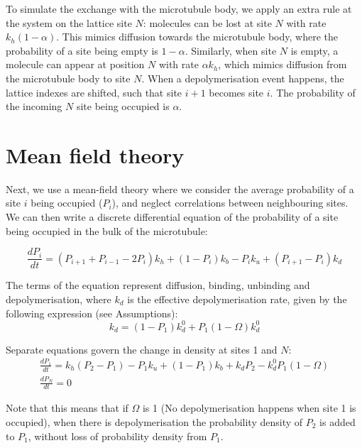 \documentclass{article}
\begin{document}
To simulate the exchange with the microtubule body, we apply an extra rule at the system on the lattice site $N$: molecules can be lost at site $N$ with rate $k_h(1-\alpha)$. This mimics diffusion towards the microtubule body, where the probability of a site being empty is $1-\alpha$. Similarly, when site $N$ is empty, a molecule can appear at position $N$ with rate $\alpha k_h$, which mimics diffusion from the microtubule body to site $N$.
When a depolymerisation event happens, the lattice indexes are shifted, such that site $i+1$ becomes site $i$. The probability of the incoming $N$ site being occupied is $\alpha$.

\section{Mean field theory}

Next, we use a mean-field theory where we consider the average probability of a site $i$ being occupied ($P_i$), and neglect correlations between neighbouring sites. We can then write a discrete differential equation of the probability of a site being occupied in the bulk of the microtubule:

\begin{equation}
\label{eq:dPi}
\frac{dP_i}{dt} = 
(P_{i+1} + P_{i-1} - 2P_i) k_h   + %
(1-P_i)k_b - P_i k_u   + %
(P_{i+1}-P_i)k_d %
\end{equation}

The terms of the equation represent diffusion, binding,  unbinding and depolymerisation, where $k_d$ is the effective depolymerisation rate, given by the following expression (see Assumptions):
\begin{equation}
\label{eq:k_d}
k_d = (1-P_1)k_d^0 + P_1(1-\Omega)k_d^0
\end{equation}

Separate equations govern the change in density at sites 1 and $N$:
\begin{gather}
\label{eq:dP1}
\frac{dP_1}{dt}=k_h (P_2-P_1) %
 - P_1  k_u + (1 - P_1)  k_b %
 + k_d  P_2 - k_d^0  P_1  (1 - \Omega)\\ 
 \label{eq:dPN}
\frac{dP_N}{dt} = 0
\end{gather}

Note that this means that if $\Omega$ is 1 (No depolymerisation happens when site 1 is occupied), when there is depolymerisation the probability density of $P_2$ is added to $P_1$, without loss of probability density from $P_1$.
\end{document}
